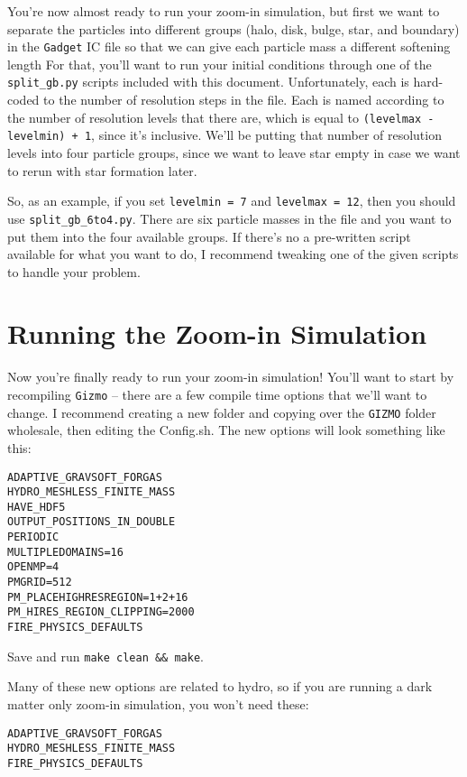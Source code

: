 \documentclass[10pt,a4paper,onecolumn]{article}
\begin{document}
You're now almost ready to run your zoom-in simulation, but first we want to separate the
particles into different groups (halo, disk, bulge, star, and boundary) in the \texttt{Gadget} 
IC file so that we can give each particle mass a different softening length  For that, you'll want to 
run your initial conditions through one of the \texttt{split\_gb.py} scripts included with this 
document.  Unfortunately, each is hard-coded to the number of resolution steps in the file.  
Each is named according to the number of resolution levels that there are, which is equal to 
\texttt{(levelmax - levelmin) + 1}, since it's inclusive.  We'll be putting that number of resolution 
levels into four particle groups, since we want to leave star empty in case we want to rerun
with star formation later.

So, as an example, if you set \texttt{levelmin = 7} and \texttt{levelmax = 12}, then you 
should use \texttt{split\_gb\_6to4.py}.  There are six particle masses in the file and you 
want to put them into the four available groups.  If there's no a pre-written script available
for what you want to do, I recommend tweaking one of the given scripts to handle your
problem.

\section{Running the Zoom-in Simulation}
Now you're finally ready to run your zoom-in simulation!  You'll want to start by recompiling
\texttt{Gizmo} -- there are a few compile time options that we'll want to change.  I recommend creating
a new folder and copying over the \texttt{GIZMO} folder wholesale, then editing the Config.sh. The new options will look something like this:

\begin{verbatim}
ADAPTIVE_GRAVSOFT_FORGAS
HYDRO_MESHLESS_FINITE_MASS
HAVE_HDF5
OUTPUT_POSITIONS_IN_DOUBLE
PERIODIC
MULTIPLEDOMAINS=16
OPENMP=4
PMGRID=512
PM_PLACEHIGHRESREGION=1+2+16
PM_HIRES_REGION_CLIPPING=2000
FIRE_PHYSICS_DEFAULTS
\end{verbatim}

Save and run \texttt{make clean \&\& make}.

Many of these new options are related to hydro, so if you are running a dark matter only zoom-in simulation, you won't need these:

\begin{verbatim}
ADAPTIVE_GRAVSOFT_FORGAS
HYDRO_MESHLESS_FINITE_MASS
FIRE_PHYSICS_DEFAULTS
\end{verbatim}
\end{document}

